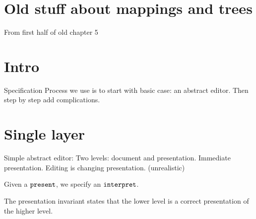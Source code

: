 %																
%																
%																
\section{Old stuff about mappings and trees}

\bl
\* From first half of old chapter 5
\el



%																
%																
%																
\section{Intro}


\bl
\* Specification
\* Process we use is to start with basic case: an abstract editor. 
\* Then step by step add complications.
\el



%																
%																
%																
\section{Single layer}

\bl
\* Simple abstract editor: Two levels: document and presentation.
\* Immediate presentation.
\* Editing is changing presentation. (unrealistic)
\el


Given a ${\tt present}$, we specify an ${\tt interpret}$.




\bl
\* The presentation invariant states that the lower level is a correct presentation of the higher level.
\el


